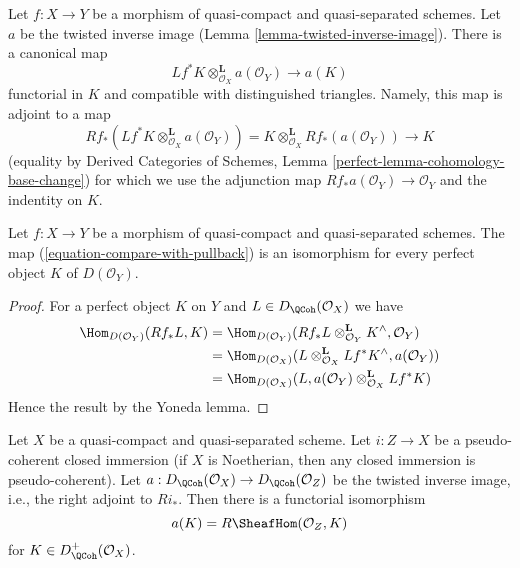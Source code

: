 \noindent
Let $f : X \to Y$ be a morphism of quasi-compact and quasi-separated
schemes. Let $a$ be the twisted inverse image
(Lemma \ref{lemma-twisted-inverse-image}). There is a canonical
map
\begin{equation}
\label{equation-compare-with-pullback}
Lf^*K \otimes^\mathbf{L}_{\mathcal{O}_X} a(\mathcal{O}_Y) \longrightarrow a(K)
\end{equation}
functorial in $K$ and compatible with distinguished triangles.
Namely, this map is adjoint to a map
$$
Rf_*(Lf^*K \otimes^\mathbf{L}_{\mathcal{O}_X} a(\mathcal{O}_Y)) =
K \otimes^\mathbf{L}_{\mathcal{O}_X} Rf_*(a(\mathcal{O}_Y))
\longrightarrow K
$$
(equality by Derived Categories of Schemes, Lemma
\ref{perfect-lemma-cohomology-base-change})
for which we use the adjunction map $Rf_*a(\mathcal{O}_Y) \to \mathcal{O}_Y$
and the indentity on $K$.

\begin{lemma}
\label{lemma-compare-with-pullback-perfect}
Let $f : X \to Y$ be a morphism of quasi-compact and quasi-separated
schemes. The map (\ref{equation-compare-with-pullback}) is an isomorphism
for every perfect object $K$ of $D(\mathcal{O}_Y)$.
\end{lemma}

\begin{proof}
For a perfect object $K$ on $Y$ and $L \in D_\QCoh(\mathcal{O}_X)$
we have
\begin{align*}
\Hom_{D(\mathcal{O}_Y)}(Rf_*L, K)
& =
\Hom_{D(\mathcal{O}_Y)}(
Rf_*L \otimes^\mathbf{L}_{\mathcal{O}_Y} K^\wedge, \mathcal{O}_Y) \\
& =
\Hom_{D(\mathcal{O}_X)}(
L \otimes^\mathbf{L}_{\mathcal{O}_X} Lf^*K^\wedge, a(\mathcal{O}_Y)) \\
& =
\Hom_{D(\mathcal{O}_X)}(L,
a(\mathcal{O}_Y) \otimes^\mathbf{L}_{\mathcal{O}_X} Lf^*K)
\end{align*}
Hence the result by the Yoneda lemma.
\end{proof}

\begin{lemma}
\label{lemma-twisted-inverse-image-closed}
Let $X$ be a quasi-compact and quasi-separated scheme.
Let $i : Z \to X$ be a pseudo-coherent closed immersion
(if $X$ is Noetherian, then any closed immersion is pseudo-coherent).
Let $a : D_\QCoh(\mathcal{O}_X) \to D_\QCoh(\mathcal{O}_Z)$ be the
twisted inverse image, i.e., the right adjoint to $Ri_*$. Then there
is a functorial isomorphism
$$
a(K) = R\SheafHom(\mathcal{O}_Z, K)
$$
for $K \in D_\QCoh^+(\mathcal{O}_X)$.
\end{lemma}

